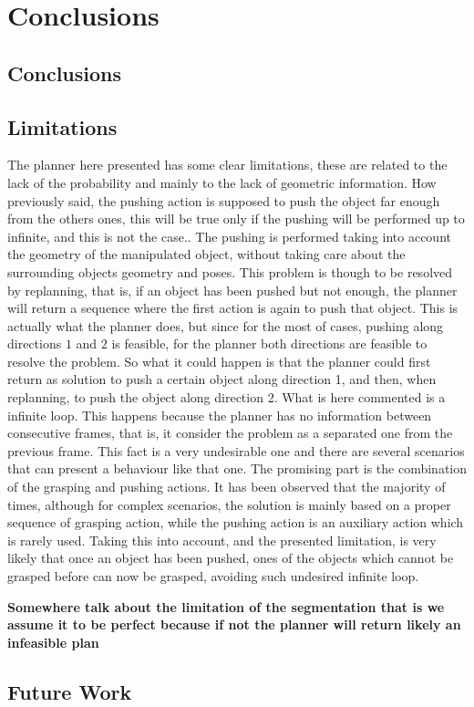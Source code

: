 \chapter{Conclusions}
\label{ch:conclusions}

\section{Conclusions}

\section{Limitations}
The planner here presented has some clear limitations, these are related to the lack of the probability and mainly to the lack of geometric information. 
How previously said, the pushing action is supposed to push the object far enough from the others ones, this will be true only if the pushing will be performed up to infinite, and this is not the case.. The pushing is performed taking into account the geometry of the manipulated object, without taking care about the surrounding objects geometry and poses. This problem is though to be resolved by replanning, that is, if an object has been pushed but not enough, the planner will return a sequence where the first action is again to push that object. This is actually what the planner does, but since for the most of cases, pushing along directions $1$ and $2$ is feasible, for the planner both directions are feasible to resolve the problem. So what it could happen is that the planner could first return as solution to push a certain object along direction 1, and then, when replanning, to push the object along direction 2. What is here commented is a infinite loop. This happens because the planner has no information between consecutive frames, that is, it consider the problem as a separated one from the previous frame. 
This fact is a very undesirable one and there are several scenarios that can present a behaviour like that one. The promising part is the combination of the grasping and pushing actions. It has been observed that the majority of times, although for complex scenarios, the solution is mainly based on a proper sequence of grasping action, while the pushing action is an auxiliary action which is rarely used. Taking this into account, and the presented limitation, is very likely that once an object has been pushed, ones of the objects which cannot be grasped before can now be grasped, avoiding such undesired infinite loop.  


\textbf{Somewhere talk about the limitation of the segmentation that is we assume it to be perfect because if not the planner will return likely an infeasible plan}

\section{Future Work}